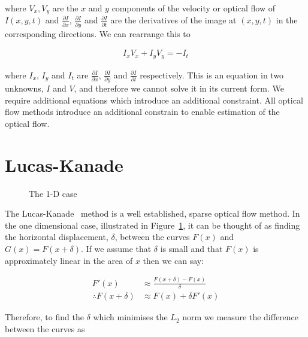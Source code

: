 where $V_x,V_y$ are the $x$ and $y$ components of the velocity or optical flow of $I(x,y,t)$ and $\tfrac{\partial I}{\partial x}$, $\tfrac{\partial I}{\partial y}$ and $\tfrac{\partial I}{\partial t}$ are the derivatives of the image at $(x,y,t)$ in the corresponding directions. We can rearrange this to

\begin{align*}
  I_xV_x+I_yV_y=-I_t
\end{align*}

where $I_x$, $I_y$ and $I_t$ are $\tfrac{\partial I}{\partial x}$, $\tfrac{\partial I}{\partial y}$ and $\tfrac{\partial I}{\partial t}$ respectively. This is an equation in two unknowns, $I$ and $V$, and therefore we cannot solve it in its current form. We require additional equations which introduce an additional constraint. All optical flow methods introduce an additional constrain to enable estimation of the optical flow.

\section{Lucas-Kanade}

\begin{figure}[h]
  \centering
  \caption{The 1-D case}
  \label{fig:lucas-kanade}
\end{figure}

The Lucas-Kanade~\cite{lucas-kanade} method is a well established, sparse optical flow method. In the one dimensional case, illustrated in Figure~\ref{fig:lucas-kanade}, it can be thought of as finding the horizontal displacement, $\delta$, between the curves $F(x)$ and $G(x)=F(x+\delta)$. If we assume that $\delta$ is small and that $F(x)$ is approximately linear in the area of $x$ then we can say:

\begin{align*}
F'(x) &\approx \frac{F(x+\delta)-F(x)}{\delta} \\
\therefore F(x + \delta) &\approx F(x) + \delta F'(x) 
\end{align*}

Therefore, to find the $\delta$ which minimises the $L_2$ norm we measure the difference between the curves as

